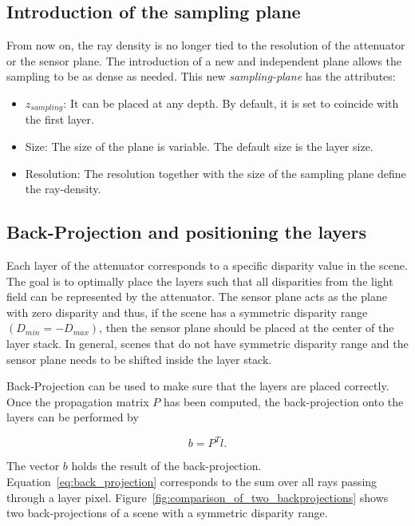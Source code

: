 \documentclass[11pt,a4paper,titlepage]{article}
\begin{document}
\clearpage

\subsection{Introduction of the sampling plane}
From now on, the ray density is no longer tied to the resolution of the attenuator or the sensor plane. The introduction of a new and independent plane allows the sampling to be as dense as needed. This new \emph{sampling-plane} has the attributes:

\begin{itemize}
	\item	$z_{sampling}$: It can be placed at any depth. By default, it is set to coincide with the first layer.
	\item	Size: The size of the plane is variable. The default size is the layer size.
	\item	Resolution: The resolution together with the size of the sampling plane define the ray-density.
\end{itemize}

\subsection{Back-Projection and positioning the layers}
Each layer of the attenuator corresponds to a specific disparity value in the scene. The goal is to optimally place the layers such that all disparities from the light field can be represented by the attenuator. The sensor plane acts as the plane with zero disparity and thus, if the scene has a symmetric disparity range $\left(D_{min} = -D_{max}\right)$, then the sensor plane should be placed at the center of the layer stack. In general, scenes that do not have symmetric disparity range and the sensor plane needs to be shifted inside the  layer stack. 

Back-Projection can be used to make sure that the layers are placed correctly. Once the propagation matrix $P$ has been computed, the back-projection onto the layers can be performed by

\begin{equation} \label{eq:back_projection}
	b = P^T l.
\end{equation}

The vector $b$ holds the result of the back-projection. Equation~\ref{eq:back_projection} corresponds to the sum over all rays passing through a layer pixel. Figure~\ref{fig:comparison_of_two_backprojections} shows two back-projections of a scene with a symmetric disparity range.
\end{document}
